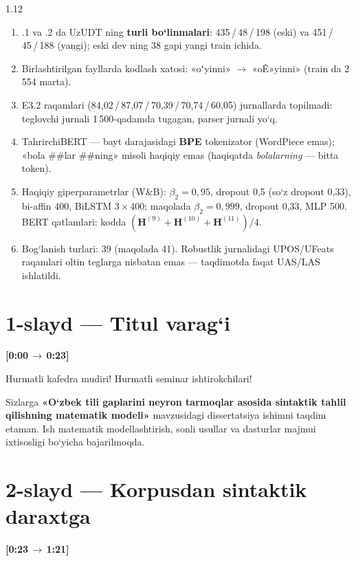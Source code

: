 \documentclass[14pt,a4paper]{extarticle}
\let\origsection\section
\renewcommand{\section}{\Needspace*{9\baselineskip}\origsection}
\newcommand{\timing}[2]{%
   \par\nobreak\noindent\textbf{[#1\,$\to$\,#2]}\par\vspace{0.3em}}
\newcommand{\say}[1]{\textbf{#1}}
\begin{document}
\begin{spacing}{1.12}
\begin{enumerate}[itemsep=2pt]
        oshiradi» xulosasi bu jurnallar bilan tasdiqlanmaydi.
  \item .1 va .2 da UzUDT ning \textbf{turli bo‘linmalari}: 435\,/\,48\,/\,198 (eski) va
        451\,/\,45\,/\,188 (yangi); eski dev ning 38 gapi yangi train ichida.
  \item Birlashtirilgan fayllarda kodlash xatosi: «oʻyinni» $\to$ «oÊ»yinni» (train da 2\,554 marta).
  \item E3.2 raqamlari (84,02\,/\,87,07\,/\,70,39\,/\,70,74\,/\,60,05) jurnallarda topilmadi:
        teglovchi jurnali 1\,500-qadamda tugagan, parser jurnali yo‘q.
  \item TahrirchiBERT --- bayt darajasidagi \textbf{BPE} tokenizator (WordPiece emas);
        «bola \#\#lar \#\#ning» misoli haqiqiy emas (haqiqatda \textit{bolalarning} --- bitta token).
  \item Haqiqiy giperparametrlar (W\&B): $\beta_2=0{,}95$, dropout 0,5 (so‘z dropout 0,33),
        bi-affin 400, BiLSTM $3\times400$; maqolada $\beta_2=0{,}999$, dropout 0,33, MLP 500.
        BERT qatlamlari: kodda $(\mathbf H^{(9)}+\mathbf H^{(10)}+\mathbf H^{(11)})/4$.
  \item Bog‘lanish turlari: 39 (maqolada 41). Robustlik jurnalidagi UPOS/UFeats raqamlari
        oltin teglarga nisbatan emas --- taqdimotda faqat UAS/LAS ishlatildi.
\end{enumerate}

\end{spacing}

\newpage

\section*{1-slayd --- Titul varag‘i}
\timing{0:00}{0:23}

Hurmatli kafedra mudiri! Hurmatli seminar ishtirokchilari!

Sizlarga \say{«O‘zbek tili gaplarini neyron tarmoqlar asosida sintaktik tahlil
qilishning matematik modeli»} mavzusidagi dissertatsiya ishimni taqdim etaman.
Ish matematik modellashtirish, sonli usullar va dasturlar majmui ixtisosligi
bo‘yicha bajarilmoqda.

\section*{2-slayd --- Korpusdan sintaktik daraxtga}
\timing{0:23}{1:21}
\end{document}
